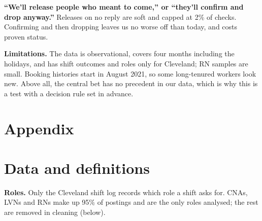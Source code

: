 \textbf{``We'll release people who meant to come,'' or ``they'll confirm and drop anyway.''} Releases on no reply are
soft and capped at 2\% of checks. Confirming and then dropping leaves us no worse off than today, and costs proven
status.

\textbf{Limitations.} The data is observational, covers four months including the holidays, and has shift outcomes and
roles only for Cleveland; RN samples are small. Booking histories start in August 2021, so some long-tenured workers look new. Above all, the central bet has no precedent in our data, which is why
this is a test with a decision rule set in advance.

\clearpage
\appendix
\renewcommand{\thesection}{\Alph{section}}
\renewcommand{\thefigure}{\Alph{section}\arabic{figure}}
\renewcommand{\thetable}{\Alph{section}\arabic{table}}
\section*{Appendix}

\section{Data and definitions}
\textbf{Roles.} Only the Cleveland shift log records which role a shift asks for. CNAs, LVNs and RNs make up 95\% of
postings and are the only roles analysed; the rest are removed in cleaning (below).

